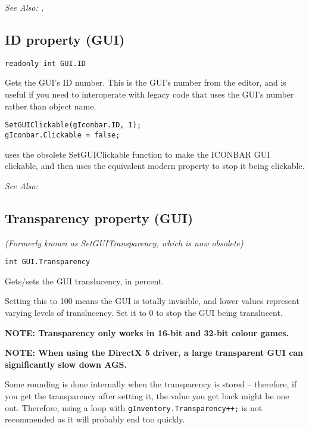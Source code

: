 \it{See Also:} , 


\subsection{ID property (GUI)}\label{GUI.ID}%

\begin{verbatim}
readonly int GUI.ID
\end{verbatim}
Gets the GUI's ID number. This is the GUI's number from the editor, and is useful
if you need to interoperate with legacy code that uses the GUI's number rather than
object name.

\begin{verbatim}
SetGUIClickable(gIconbar.ID, 1);
gIconbar.Clickable = false;
\end{verbatim}
uses the obsolete SetGUIClickable function to make the ICONBAR GUI clickable,
and then uses the equivalent modern property to stop it being clickable.

\it{See Also:} 


\subsection{Transparency property (GUI)}\label{GUI.Transparency}%

\it{(Formerly known as SetGUITransparency, which is now obsolete)}

\begin{verbatim}
int GUI.Transparency
\end{verbatim}
Gets/sets the GUI translucency, in percent.

Setting this to 100 means the GUI is totally invisible, and lower values
represent varying levels of translucency. Set it to 0 to stop the
GUI being translucent.

\bf{NOTE:} Transparency only works in 16-bit and 32-bit colour games.

\bf{NOTE:} When using the DirectX 5 driver, a large transparent GUI can significantly slow
down AGS.

Some rounding is done internally when the transparency is stored -- therefore, if you get
the transparency after setting it, the value you get back might be one out. Therefore, using
a loop with \verb$gInventory.Transparency++;$ is not recommended as it will probably
end too quickly.

